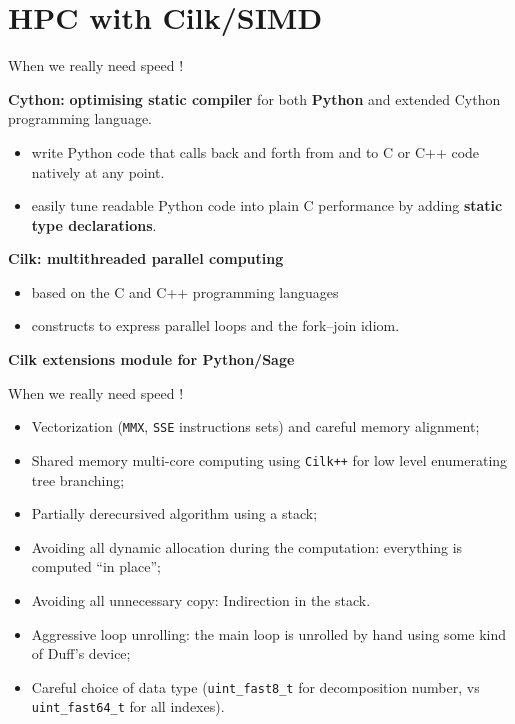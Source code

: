 \documentclass[compress,11pt]{beamer}
\begin{document}
\section{HPC with Cilk/SIMD}


\newcommand{\CilkP}{\texttt{Cilk++}\xspace}
\newcommand{\CPP}{\texttt{C++}\xspace}
\newcommand{\MMX}{\texttt{MMX}\xspace}
\newcommand{\SIMD}{\texttt{SIMD}\xspace}
\newcommand{\SSE}{\texttt{SSE}\xspace}
\newcommand{\SSEV}{\texttt{SSE4.1}\xspace}

\begin{frame}[fragile]{When we really need speed !}

  \textbf{Cython:} \textbf{optimising static compiler} for both
  \textbf{Python} and extended Cython programming language.

\begin{itemize}
\item write Python code that calls back and forth from and to C or C++ code
  natively at any point.
\item easily tune readable Python code into plain C performance by adding
  \textbf{static type declarations}.
\end{itemize}
\bigskip\pause

\textbf{Cilk: multithreaded parallel computing}
\begin{itemize}
\item based on the C and C++ programming languages
\item constructs to express parallel loops and the fork–join idiom.
\end{itemize}
\bigskip\pause

\centering \textbf{\Large\color{red}Cilk extensions module for Python/Sage}
\end{frame}

\begin{frame}[fragile]{When we really need speed !}
\begin{itemize}

\item Vectorization (\MMX, \SSE instructions sets) and careful memory alignment;
\item Shared memory multi-core computing using \CilkP for low level
  enumerating tree branching;
\item Partially derecursived algorithm using a stack;
\item Avoiding all dynamic allocation during the computation: everything is
  computed ``in place'';
\item Avoiding all unnecessary copy: Indirection in the stack.
\item Aggressive loop unrolling: the main loop is unrolled by hand using some
  kind of Duff's device;
\item Careful choice of data type (\verb|uint_fast8_t| for decomposition
  number, vs \verb|uint_fast64_t| for all indexes).
\end{itemize}  
\end{frame}
\end{document}
